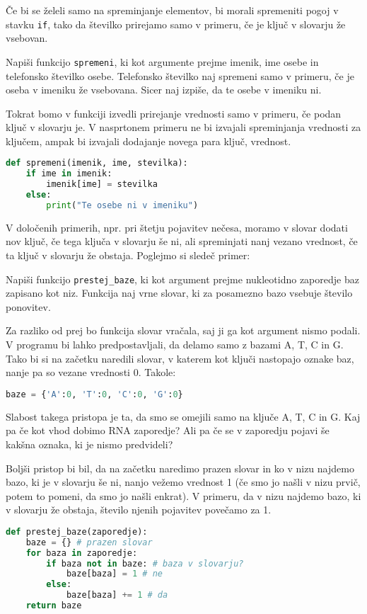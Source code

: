 Če bi se želeli samo na spreminjanje elementov, bi morali spremeniti pogoj v stavku \texttt{if}, tako da številko prirejamo samo v primeru, če je ključ v slovarju že vsebovan.
\begin{zgled}
Napiši funkcijo \texttt{spremeni}, ki kot argumente prejme imenik, ime osebe in telefonsko številko osebe. Telefonsko številko naj spremeni samo v primeru, če je oseba v imeniku že vsebovana. Sicer naj izpiše, da te osebe v imeniku ni.
\end{zgled}
\begin{resitev}
Tokrat bomo v funkciji izvedli prirejanje vrednosti samo v primeru, če podan ključ v slovarju je. V nasprtonem primeru ne bi izvajali spreminjanja vrednosti za ključem, ampak bi izvajali dodajanje novega para ključ, vrednost.
\begin{lstlisting}[language=Python]
def spremeni(imenik, ime, stevilka):
    if ime in imenik:
        imenik[ime] = stevilka
    else:
        print("Te osebe ni v imeniku")
\end{lstlisting}
\end{resitev}

V določenih primerih, npr. pri štetju pojavitev nečesa, moramo v slovar dodati nov ključ, če tega ključa v slovarju še ni, ali spreminjati nanj vezano vrednost, če ta ključ v slovarju že obstaja. Poglejmo si sledeč primer:

\begin{zgled}
Napiši funkcijo \texttt{prestej\_baze}, ki kot argument prejme nukleotidno zaporedje baz zapisano kot niz. Funkcija naj vrne slovar, ki za posamezno bazo vsebuje število ponovitev.
\end{zgled}
\begin{resitev}
Za razliko od prej bo funkcija slovar vračala, saj ji ga kot argument nismo podali. V programu bi lahko predpostavljali, da delamo samo z bazami A, T, C in G. Tako bi si na začetku naredili slovar, v katerem kot ključi nastopajo oznake baz, nanje pa so vezane vrednosti 0. Takole:
\begin{lstlisting}[language=Python]
baze = {'A':0, 'T':0, 'C':0, 'G':0}
\end{lstlisting}
Slabost takega pristopa je ta, da smo se omejili samo na ključe A, T, C in G. Kaj pa če kot vhod dobimo RNA zaporedje? Ali pa če se v zaporedju pojavi še kakšna oznaka, ki je nismo predvideli?

Boljši pristop bi bil, da na začetku naredimo prazen slovar in ko v nizu najdemo bazo, ki je v slovarju še ni, nanjo vežemo vrednost 1 (če smo jo našli v nizu prvič, potem to pomeni, da smo jo našli enkrat). V primeru, da v nizu najdemo bazo, ki v slovarju že obstaja, število njenih pojavitev povečamo za 1. 
\begin{lstlisting}[language=Python]
def prestej_baze(zaporedje):
    baze = {} # prazen slovar
    for baza in zaporedje:
        if baza not in baze: # baza v slovarju? 
            baze[baza] = 1 # ne
        else:
            baze[baza] += 1 # da
    return baze
\end{lstlisting}

\end{resitev}


